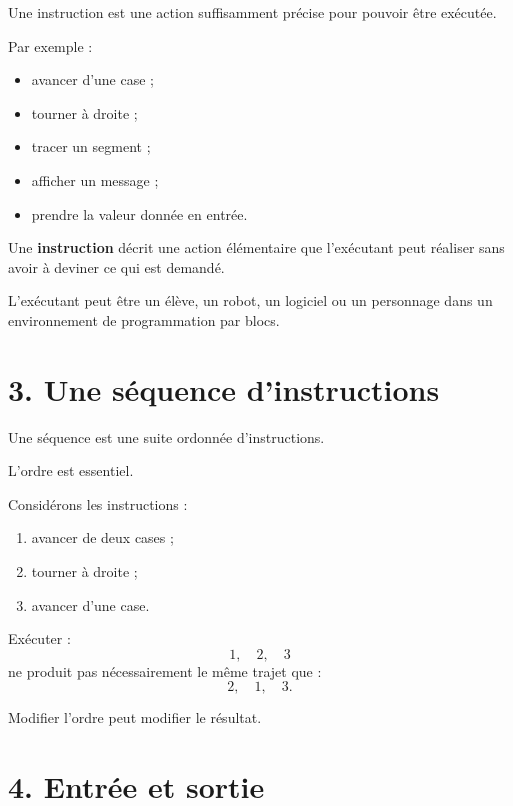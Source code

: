 Une instruction est une action suffisamment précise pour pouvoir être exécutée.

Par exemple :
\begin{itemize}
\item avancer d'une case ;
\item tourner à droite ;
\item tracer un segment ;
\item afficher un message ;
\item prendre la valeur donnée en entrée.
\end{itemize}

\begin{definition}
Une \textbf{instruction} décrit une action élémentaire que l'exécutant peut réaliser sans avoir à deviner ce qui est demandé.
\end{definition}

L'exécutant peut être un élève, un robot, un logiciel ou un personnage dans un environnement de programmation par blocs.

\section{3. Une séquence d'instructions}

Une séquence est une suite ordonnée d'instructions.

L'ordre est essentiel.

\begin{exemple}
Considérons les instructions :
\begin{enumerate}
\item avancer de deux cases ;
\item tourner à droite ;
\item avancer d'une case.
\end{enumerate}

Exécuter :
\[
1,\quad2,\quad3
\]
ne produit pas nécessairement le même trajet que :
\[
2,\quad1,\quad3.
\]
\end{exemple}

Modifier l'ordre peut modifier le résultat.


\section{4. Entrée et sortie}

